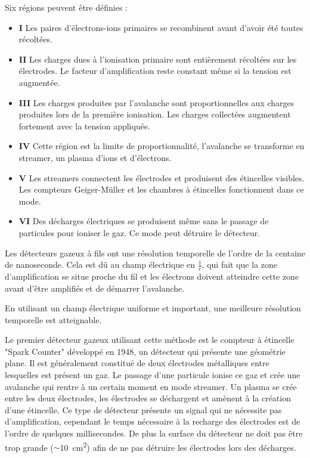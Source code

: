 Six régions peuvent être définies :

\begin{itemize}
	\item \textbf{I} Les paires d'électrons-ions primaires se recombinent avant d'avoir été toutes récoltées.
	\item \textbf{II} Les charges dues à l'ionisation primaire sont entièrement récoltées sur les électrodes. Le facteur d'amplification reste constant même si la tension est augmentée.
	\item \textbf{III} Les charges produites par l'avalanche sont proportionnelles aux charges produites lors de la première ionisation. Les charges collectées augmentent fortement avec la tension appliquée.
	\item \textbf{IV} Cette région est la limite de proportionnalité, l'avalanche se transforme en streamer, un plasma d'ions et d'électrons.
	\item \textbf{V} Les streamers connectent les électrodes et produisent des étincelles visibles. Les compteurs Geiger-Müller et les chambres à étincelles fonctionnent dans ce mode.
	\item \textbf{VI} Des décharges électriques se produisent même sans le passage de particules pour ioniser le gaz. Ce mode peut détruire le détecteur.
\end{itemize}

Les détecteurs gazeux à fils ont une résolution temporelle de l'ordre de la centaine de nanoseconde. Cela est dû au champ électrique en $\frac{1}{r}$, qui fait que la zone d'amplification se situe proche du fil et les électrons doivent atteindre cette zone avant d'être amplifiés et de démarrer l'avalanche.

En utilisant un champ électrique uniforme et important, une meilleure résolution temporelle est atteignable.

Le premier détecteur gazeux utilisant cette méthode est le compteur à étincelle "Spark Counter" développé en 1948, un détecteur qui présente une géométrie plane. Il est généralement constitué de deux électrodes métalliques entre lesquelles est présent un gaz. Le passage d'une particule ionise ce gaz et crée une avalanche qui rentre à un certain moment en mode streamer. Un plasma se crée entre les deux électrodes, les électrodes se déchargent et amènent à la création d'une étincelle. Ce type de détecteur présente un signal qui ne nécessite pas d'amplification, cependant le temps nécessaire à la recharge des électrodes est de l'ordre de quelques millisecondes. De plus la surface du détecteur ne doit pas être trop grande ($\sim$\SI{10}{\square\centi\meter}) afin de ne pas détruire les électrodes lors des décharges.

